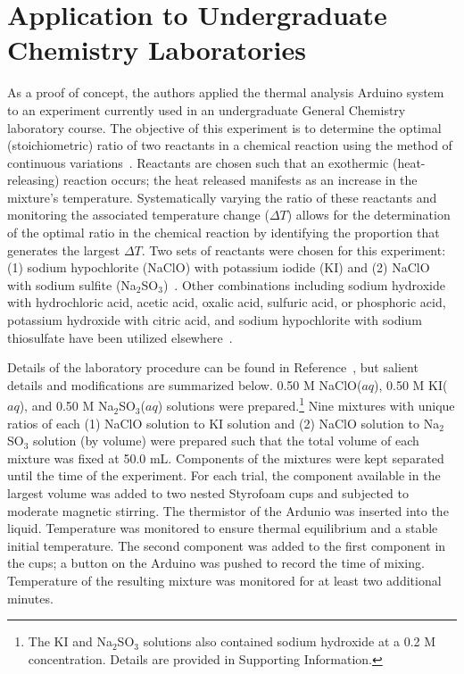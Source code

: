 \section{Application to Undergraduate Chemistry Laboratories}
As a proof of concept, the authors applied the thermal analysis Arduino system to an experiment currently used in an undergraduate 
General Chemistry laboratory course.  The objective of this experiment is to determine the optimal (stoichiometric) ratio of two 
reactants in a chemical reaction using the method of continuous variations~\cite{job}.  Reactants are chosen such that an 
exothermic (heat-releasing) reaction occurs; the heat released manifests as an increase in the mixture’s temperature.  
Systematically varying the ratio of these reactants and monitoring the associated temperature change ($\Delta T$) allows for the 
determination of the optimal ratio in the chemical reaction by identifying the proportion that generates the largest $\Delta T$.  
Two sets of reactants were chosen for this experiment: (1) sodium hypochlorite (NaClO) with potassium iodide (KI) and (2) NaClO with 
sodium sulfite (Na$_2$SO$_3$)~\cite{vonderbrink}.  Other combinations including 
sodium hydroxide with hydrochloric acid, 
acetic acid, 
oxalic acid,
sulfuric acid, or
phosphoric acid,
potassium hydroxide with citric acid, and sodium hypochlorite with sodium 
thiosulfate have been utilized elsewhere~\cite{mahoney,vernier,vonderbrink,tatsuoka}.

Details of the laboratory procedure can be found in Reference~\cite{vonderbink}, but 
salient details and modifications are summarized below.   0.50 M NaClO($aq$), 0.50 M KI($aq$), and 0.50 M Na$_2$SO$_3$($aq$) 
solutions were prepared.\footnote{The KI and Na$_2$SO$_3$ solutions also contained sodium hydroxide at a  0.2 M concentration.  
Details are provided in Supporting Information.}  Nine mixtures with unique ratios of each (1) NaClO solution to 
KI solution and (2) NaClO solution to Na$_2$SO$_3$ solution (by volume) were prepared such that the total volume of 
each mixture was fixed at 50.0 mL.  Components of the mixtures were kept separated until the time of the experiment.  For 
each trial, the component available in the largest volume was added to two nested Styrofoam cups and subjected to moderate magnetic stirring.  
The thermistor of the Ardunio was inserted into the liquid.  Temperature was monitored to ensure thermal equilibrium and a stable initial temperature.  
The second component was added to the first component in the cups; a button on the Arduino was pushed to record the time of mixing.  
Temperature of the resulting mixture was monitored for at least two additional minutes.  

